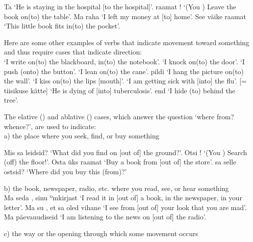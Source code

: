 Ta   `He is staying in the hospital [\lit to the hospital]'.  raamat ! `(You \sing) Leave the book on(to) the table'. Ma  raha  `I left my money at [to] home'. See väike raamat   `This little book fits in(to) the pocket'.

\newSection \label{section-112} Here are some other examples of verbs that indicate movement toward something and thus require cases that indicate direction: \\

  `I write on(to) the blackboard, in(to) the notebook'.   `I knock on(to) the door'.   `I push (onto) the button'.   `I lean on(to) the cane'.  pildi  `I hang the picture on(to) the wall'.   `I kiss on(to) the lips [mouth]'.   `I am getting sick with [into] the flu'.   [= tiisikuse kätte] `He is dying of [into] tuberculosis'.  end  `I hide (to) behind the tree'.

\newSection \label{section-113} The elative () and ablative () cases, which answer the question `where from? whence?', are used to indicate: \\

	\oneColumnTable
	a) the place where you seek, find, or buy something \\
	\tableEnd

Mis sa  leidsid? `What did you find on [out of] the ground?'. Otsi ! `(You \sing) Search (off) the floor!'. Osta  üks raamat `Buy a book from [out of] the store'.  sa selle ostsid? `Where did you \sing buy this (from)?'

\newSection \label{section-114} b) the book, newspaper, radio, etc. where you read, see, or hear something \\

Ma  seda , sinu ºm{kirjast} `I read it in [out of] a book, in the newspaper, in your letter'. Ma  su , et sa oled vihane `I see from [out of] your look that you are mad'. Ma  päevauudiseid  `I am listening to the news on [out of] the radio'. 

\newSection \label{section-115} c) the way or the opening through which some movement occurs \\

